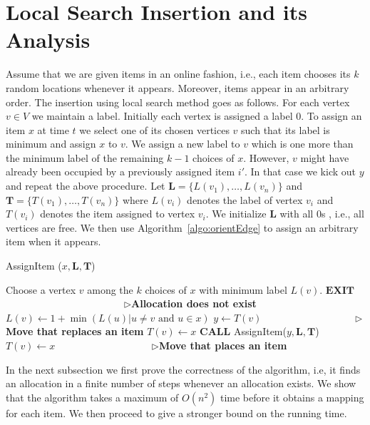 \section{Local Search Insertion and its Analysis}
Assume that we are given items in an online fashion, i.e., each item chooses its $k$ random locations whenever it appears. Moreover, items appear in an arbitrary order.  The insertion using local search method goes as follows. For each vertex $v\in V$ we maintain a label. Initially each vertex is assigned a label $0$. To assign an item $x$ at time $t$ we select one of its chosen vertices $v$ such that its label is minimum and assign $x$ to $v$. We assign a new label to $v$ which is one more than the minimum label of the remaining $k-1$ choices of $x$. However,  $v$ might have already been occupied by a previously assigned item $i'$. In that case we kick out $y$ and repeat the above procedure. Let $\mathbf{L}= \{ L(v_1), \ldots, L(v_n)\}$  and $\mathbf{T}= \{ T(v_1), \ldots, T(v_n)\}$ where $L(v_i)$ denotes the label of vertex $v_i$ and $T(v_i)$ denotes the item assigned to vertex $v_i$.  We initialize $\mathbf{L}$ with all $0$s , i.e., all vertices are free. We then use Algorithm~\ref{algo:orientEdge} to assign an arbitrary item when it appears. 
\begin{algorithm}[h!]
\caption{AssignItem ($x, \mathbf{L},\mathbf{T}$)}
\label{algo:orientEdge}
\begin{algorithmic}[1]
\STATE Choose a vertex $v$ among the $k$ choices of $x$ with minimum label $L(v)$.
\STATE $\mathbf{EXIT}$  ~~~~~~~~~~~~~~~~~~~~~~~ $\rhd${\textbf{Allocation does not exist}}
\ELSE
\STATE $L(v) \leftarrow 1+ \min{(L(u)| u \neq v \text{~and $u \in x$})}$
\STATE $y\leftarrow T(v)$~~~~~~~~~~~~~~~~~~ $\rhd${\textbf{Move that replaces an item}}
\STATE $T(v) \leftarrow x$
\STATE $\mathbf{CALL}$ {AssignItem($y, \mathbf{L},\mathbf{T}$)}
\ELSE  
\STATE $T(v) \leftarrow x$ ~~~~~~~~~~~~~~~~~~ $\rhd${\textbf{Move that places an item}}
\ENDIF
\ENDIF
\end{algorithmic}
\end{algorithm}
In the next subsection we first prove the correctness of the algorithm, i.e, it finds an allocation in a finite number of steps whenever an allocation exists. We show that the algorithm takes a maximum of $O(n^2)$ time before it obtains a mapping for each item. We then proceed to give a stronger bound on the running time.



